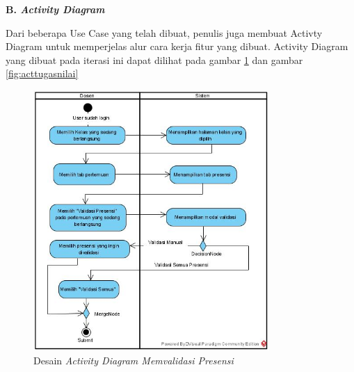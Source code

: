 \textbf{B. \textit{Activity Diagram}}

	Dari beberapa Use Case yang telah dibuat, penulis juga membuat Activty Diagram untuk memperjelas alur cara kerja fitur yang dibuat. Activity Diagram yang dibuat pada iterasi ini dapat dilihat pada gambar \ref{fig:actvalidasipresensi} dan gambar \ref{fig:acttugasnilai}


\begin{figure}[H]
	\centering
	\includegraphics[width=0.8\textwidth]{gambar/diagram/Memvalidasi presensi}
	\caption{Desain \textit{Activity Diagram Memvalidasi Presensi}}
	\label{fig:actvalidasipresensi}
\end{figure}

